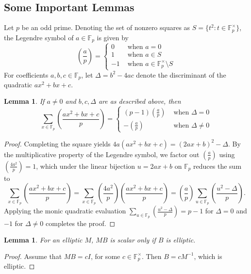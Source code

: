 \documentclass[12pt,reqno]{amsart}
\theoremstyle{plain}
\newtheorem{lemma}[thm]{Lemma}
\theoremstyle{definition}
\newcommand{\Tr}{{\rm Tr}}
\newcommand{\GL}{{\mathrm GL}}
\theoremstyle{remark}
\newcommand{\FF}{\mathbb{F}}
\begin{document}
\subsection{Some Important Lemmas}
Let $p$ be an odd prime. Denoting the set of nonzero squares as $S=\{t^2:t\in \FF_p^{\times}\}$, the Legendre symbol of $a\in \FF_p$ is given by 
$$\left(\frac{a}{p}\right)=\begin{cases}
    0 & \text{~when~} a=0\\
    1 & \text{~when~} a\in S\\
    -1 & \text{~when~} a\in \FF_p^{\times}\setminus S
\end{cases}
$$
For coefficients $a,b,c\in \FF_p$, let $\Delta=b^2-4ac$ denote the discriminant of the quadratic $ax^2+bx+c$.
\begin{lemma}\label{lem: legendre lemma} If $a\neq 0$ and $b,c, \Delta$ are as described above, then  
$$\sum_{x\in \FF_p}\left(\frac{ax^2+bx+c}{p}\right)=\begin{cases}
    (p-1)\left(\frac{a}{p}\right) & \text{~when~}\Delta=0\\
    -\left(\frac{a}{p}\right) & \text{~when~}\Delta\neq 0
\end{cases}
$$

\end{lemma}
\begin{proof}
Completing the square yields $4a(ax^2+bx+c)=(2ax+b)^2-\Delta$. By the multiplicative property of the Legendre symbol, we factor out $\left(\frac{a}{p}\right)$ using $\left(\frac{4a^2}{p}\right)=1$, which under the linear bijection $u=2ax+b$ on $\FF_p$ reduces the sum to 
$$\sum_{x\in \FF_p}\left(\frac{ax^2+bx+c}{p}\right)=\sum_{x\in \FF_p}\left(\frac{4a^2}{p}\right)\left(\frac{ax^2+bx+c}{p}\right)=\left(\frac{a}{p}\right)\sum_{u\in \FF_p}\left(\frac{u^2-\Delta}{p}\right).
$$
Applying the monic quadratic evaluation $\sum_{u\in \FF_p}\left(\frac{u^2-\Delta}{p}\right)=p-1$ for $\Delta=0$ and $-1$ for $\Delta\neq 0$ \cite[Exercise~ $6$]{ireland1990rosen} completes the proof.
\end{proof}
 \begin{lemma}\label{lem: elliptic M goes to scalar MB iff B is nonsplit ss}
    For an elliptic $M$, $MB$ is scalar only if $B$ is elliptic.
\end{lemma}
\begin{proof}
    Assume that $MB=cI$, for some $c \in \FF_p^{\times}$. Then $B= c M^{-1}$, which is elliptic.
\end{proof}
 
\end{document}
